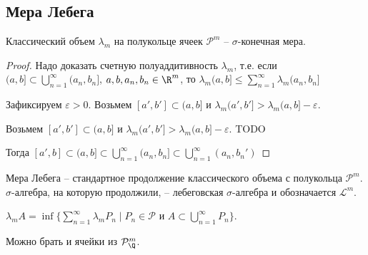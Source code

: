 \subsection{Мера Лебега}

\begin{theorem}
    Классический объем $\lambda_m$ на полукольце ячеек $\mathcal{P}^m$ – 
    $\sigma$-конечная мера.
\end{theorem}

\begin{proof}
    Надо доказать счетную полуаддитивность $\lambda_m$, т.е. если 
    $(a, b]\subset \bigcup\limits_{n=1}^\infty (a_n, b_n]$, $a, b, a_n, b_n\in \R^m$, то 
    $\lambda_m (a, b]\leq \sum\limits_{n=1}^\infty \lambda_m (a_n, b_n]$

    Зафиксируем $\varepsilon > 0$. Возьмем $[a', b']\subset (a, b]$ и $\lambda_m (a', b']>\lambda_m (a, b]-\varepsilon$.

    Возьмем $[a', b']\subset (a, b]$ и $\lambda_m (a', b']>\lambda_m (a, b]-\varepsilon$. TODO

    Тогда $[a', b]\subset (a, b]\subset \bigcup\limits_{n=1}^\infty (a_n, b_n] \subset \bigcup\limits_{n=1}^\infty (a_n, b_n')$
\end{proof}

\begin{definition}
    Мера Лебега – стандартное продолжение классического объема с полукольца 
    $\mathcal{P}^m$. $\sigma$-алгебра, на которую продолжили, – лебеговская $\sigma$-алгебра
    и обозначается $\mathcal{L}^m$.
\end{definition}

\begin{remark}
    $\lambda_m A = \inf \{\sum\limits_{n=1}^\infty \lambda_m P_n \mid P_n\in \mathcal{P}\text{ и } A\subset \bigcup\limits_{n=1}^\infty P_n \}$.

    Можно брать и ячейки из $\mathcal{P}^m_{\Q}$.
\end{remark}


